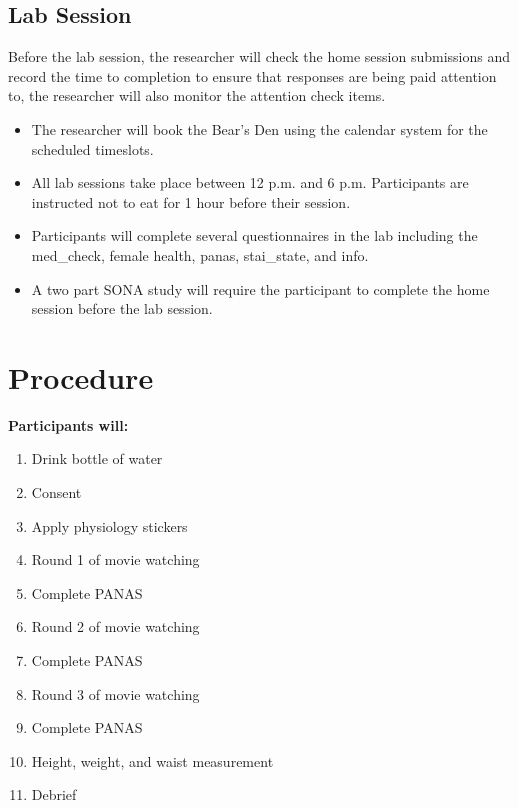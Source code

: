 \documentclass[]{book}
\providecommand{\tightlist}{%
  \setlength{\itemsep}{0pt}\setlength{\parskip}{0pt}}
\begin{document}
\hypertarget{lab-session}{%
\subsection{Lab Session}\label{lab-session}}

Before the lab session, the researcher will check the home session submissions and record the time to completion to ensure that responses are being paid attention to, the researcher will also monitor the attention check items.

\begin{itemize}
\item
  The researcher will book the Bear's Den using the calendar system for the scheduled timeslots.
\item
  All lab sessions take place between 12 p.m. and 6 p.m. Participants are instructed not to eat for 1 hour before their session.
\item
  Participants will complete several questionnaires in the lab including the med\_check, female health, panas, stai\_state, and info.
\item
  A two part SONA study will require the participant to complete the home session before the lab session.
\end{itemize}

\hypertarget{procedure-1}{%
\section{Procedure}\label{procedure-1}}

\textbf{Participants will:}

\begin{enumerate}
\def\labelenumi{\arabic{enumi}.}
\tightlist
\item
  Drink bottle of water
\item
  Consent
\item
  Apply physiology stickers
\item
  Round 1 of movie watching
\item
  Complete PANAS
\item
  Round 2 of movie watching
\item
  Complete PANAS
\item
  Round 3 of movie watching
\item
  Complete PANAS
\item
  Height, weight, and waist measurement
\item
  Debrief
\end{enumerate}
\end{document}
